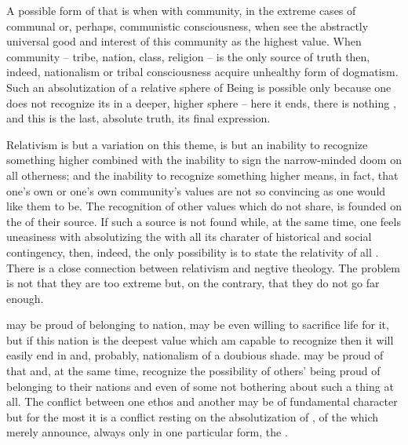 {%
\subpa 
A possible form of that is when   with  
community, in the extreme cases of communal or, perhaps, communistic 
consciousness, when  see the abstractly 
universal good and interest of this community as the highest value.  
When  community -- tribe, nation, class, religion -- is the 
only source of truth then, indeed,  nationalism or tribal 
consciousness acquire unhealthy form of dogmatism. Such an 
absolutization of a relative sphere of Being is possible only because 
one does not recognize its  in a deeper, higher 
sphere -- here it ends, there is nothing , and this is the 
last, absolute truth, its final expression. 

\pa\label{pa:relativism}
Relativism is but a variation on this theme, is but an inability to 
recognize something higher combined with the inability to sign the 
narrow-minded doom on all otherness; and the inability to recognize 
something higher means, in fact, that one's own or one's own 
community's values are not so convincing as one would like 
them to be. The recognition of other values 
which  do not share, is founded on the  of their 
source. If such a source is not found while, at the same time, one 
feels uneasiness with absolutizing the  with all its charater 
of historical and social contingency, then, indeed, the only 
possibility is to state the relativity of all . 
There is a close connection between relativism and negtive theology. 
The problem is not that they are too extreme but, on the 
contrary, that they do not go far enough.

 may be proud of belonging to  nation,  may be 
even willing to sacrifice  life for it, but if this nation
is the deepest value which  am capable to recognize then it 
will easily end in  and, probably, nationalism of a doubious 
shade.  may be proud of that and, at the same time, recognize 
the possibility of others' being proud of belonging to their nations 
and even of some not bothering about such a thing at all. 
The conflict between one ethos and another may be of fundamental 
character but for the most it is a conflict resting on the 
absolutization of , of the  which 
merely announce, always only in one particular form, the 
.

}

